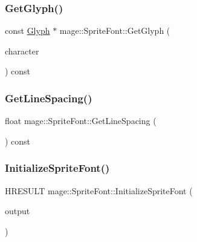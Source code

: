 \subsubsection{\texorpdfstring{Get\+Glyph()}{GetGlyph()}}
{\footnotesize\ttfamily const \hyperlink{structmage_1_1_glyph}{Glyph} $\ast$ mage\+::\+Sprite\+Font\+::\+Get\+Glyph (\begin{DoxyParamCaption}\item[{wchar\+\_\+t}]{character }\end{DoxyParamCaption}) const}

\hypertarget{classmage_1_1_sprite_font_ae90ee76625716c6cbce851b6fd14524b}{}\label{classmage_1_1_sprite_font_ae90ee76625716c6cbce851b6fd14524b} 
\subsubsection{\texorpdfstring{Get\+Line\+Spacing()}{GetLineSpacing()}}
{\footnotesize\ttfamily float mage\+::\+Sprite\+Font\+::\+Get\+Line\+Spacing (\begin{DoxyParamCaption}{ }\end{DoxyParamCaption}) const}

\hypertarget{classmage_1_1_sprite_font_a5182bb818863ba2433a40074cb1bf8a0}{}\label{classmage_1_1_sprite_font_a5182bb818863ba2433a40074cb1bf8a0} 
\subsubsection{\texorpdfstring{Initialize\+Sprite\+Font()}{InitializeSpriteFont()}}
{\footnotesize\ttfamily H\+R\+E\+S\+U\+LT mage\+::\+Sprite\+Font\+::\+Initialize\+Sprite\+Font (\begin{DoxyParamCaption}\item[{const \hyperlink{structmage_1_1_sprite_font_output}{Sprite\+Font\+Output} \&}]{output }\end{DoxyParamCaption})\hspace{0.3cm}{\ttfamily [private]}}

\hypertarget{classmage_1_1_sprite_font_a45790ee2621c2f1face455a9525be90a}{}\label{classmage_1_1_sprite_font_a45790ee2621c2f1face455a9525be90a} 
